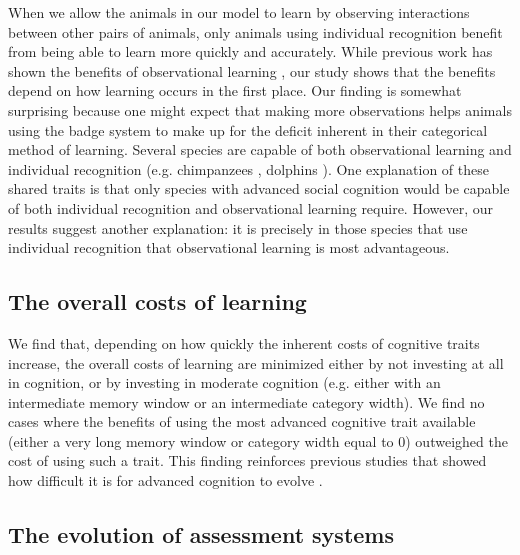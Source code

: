 When we allow the animals in our model to learn by observing interactions between other pairs of animals, only animals using individual recognition benefit from being able to learn more quickly and accurately. While previous work has shown the benefits of observational learning \citep{Freeman:1985kl,Holekamp:1991nx,Schaik:2011oq}, our study shows that the benefits depend on how learning occurs in the first place. Our finding is somewhat surprising because one might expect that making more observations helps animals using the badge system to make up for the deficit inherent in their categorical method of learning. Several species are capable of both observational learning and individual recognition (e.g. chimpanzees \citep{Parr:2000hc,Hopper:2008bh}, dolphins \citep{Sayigh:1999bs,Krutzen:2005ij}). One explanation of these shared traits is that only species with advanced social cognition would be capable of both individual recognition and observational learning require. However, our results suggest another explanation: it is precisely in those species that use individual recognition that observational learning is most advantageous.

\subsection*{The overall costs of learning} %
We find that, depending on how quickly the inherent costs of cognitive traits increase, the overall costs of learning are minimized either by not investing at all in cognition, or by investing in moderate cognition (e.g. either with an intermediate memory window or an intermediate category width). We find no cases where the benefits of using the most advanced cognitive trait available (either a very long memory window or category width equal to $0$) outweighed the cost of using such a trait. This finding reinforces previous studies that showed how difficult it is for advanced cognition to evolve \citep{Kerr:2003vn}.


\subsection*{The evolution of assessment systems} %

